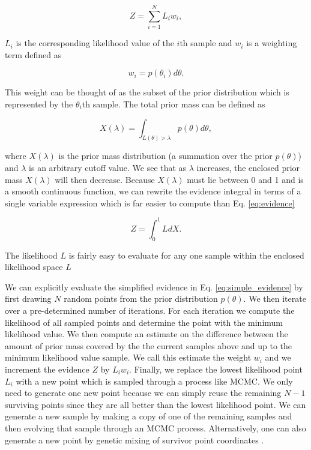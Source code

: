 \begin{equation}
    Z = \sum_{i=1}^{N} L_i w_i,
\end{equation}

$L_i$ is the corresponding likelihood value of the $i$th sample and $w_i$ is a weighting term defined as

\begin{equation}
    w_i = p(\theta_i) d\theta.
\end{equation}

This weight can be thought of as the subset of the prior distribution which is represented by the $\theta_i$th sample. The total prior mass can be defined as

\begin{equation}
    X(\lambda) = \int_{L(\theta) > \lambda} p(\theta) d\theta,
\end{equation}

where $X(\lambda)$ is the prior mass distribution (a summation over the prior $p(\theta)$) and $\lambda$ is an arbitrary cutoff value. We see that as $\lambda$ increases, the enclosed prior mass $X(\lambda)$ will then decrease. Because $X(\lambda)$ must lie between 0 and 1 and is a smooth continuous function, we can rewrite the evidence integral in terms of a single variable expression which is far easier to compute than Eq. \ref{eq:evidence}

\begin{equation}
    Z = \int_{0}^{1} L dX. \label{eq:simple_evidence}
\end{equation}

The likelihood $L$ is fairly easy to evaluate for any one sample within the enclosed likelihood space $L$ 

We can explicitly evaluate the simplified evidence in Eq. \ref{eq:simple_evidence} by first drawing $N$ random points from the prior distribution $p(\theta)$. We then iterate over a pre-determined number of iterations. For each iteration we compute the likelihood of all sampled points and determine the point with the minimum likelihood value. We then compute an estimate on the difference between the amount of prior mass covered by the the current samples above and up to the minimum likelihood value sample. We call this estimate the weight $w_i$ and we increment the evidence $Z$ by $L_i w_i$. Finally, we replace the lowest likelihood point $L_i$ with a new point which is sampled through a process like \ac{MCMC}. We only need to generate one new point because we can simply reuse the remaining $N-1$ surviving points since they are all better than the lowest likelihood point. We can generate a new sample by making a copy of one of the remaining samples and then evolving that sample through an \ac{MCMC} process. Alternatively, one can also generate a new point by genetic mixing of survivor point coordinates \cite{skilling2006}.

